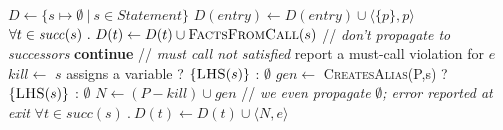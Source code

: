 \begin{algorithm}[t]
  \caption{Finding unfulfilled \<@MustCall> obligations.
  }
  \label{alg:consistency-checker}
  \begin{algorithmic}[1]
  \State $D \gets \{ s \mapsto \emptyset\ |\ s \in \mathit{Statement} \}$\label{li:start-init}
   \label{li:init-formals}
      \State $D(\mathit{entry}) \gets D(\mathit{entry}) \cup \langle \{p\}, p \rangle$
    \EndIf
  \EndFor \label{li:end-init-formals}
   \label{li:init-calls}
    \State $\forall t \in \mathit{succ}(s)\ .\ D(t) \leftarrow D(t) \cup \textsc{FactsFromCall}(s)$
  \EndFor  \label{li:end-init}
     \label{li:check-satisfied}
    \State // \textit{don't propagate to successors}
    \State \textbf{continue} 
    \EndIf
     \label{li:end-scope}
      \State // \textit{must call not satisfied}
      \State report a must-call violation for $e$
    \Else
  \State $kill \gets $ $s$ assigns a variable ? $\{\textsc{LHS}(s)\}$ : $\emptyset$ \label{li:compute-kill}
    \State $gen \gets$ \textsc{CreatesAlias}(P,s) ? $\{\textsc{LHS}(s)\}$ : $\emptyset$ \label{li:compute-gen} 
    \State $N \gets (P - kill) \cup gen$ \label{li:compute-new-mc-aliases}
    \State // \textit{we even propagate }$\emptyset$\textit{; error reported at exit}
    \State $\forall t \in \mathit{succ}(s)\ .\ D(t) \leftarrow D(t) \cup \langle
    N, e \rangle$ \label{li:prop-to-succs}
    \EndIf
    \EndFor
  \EndWhile \label{li:alg-loop-end}
  \EndProcedure
  \end{algorithmic}
\end{algorithm}

